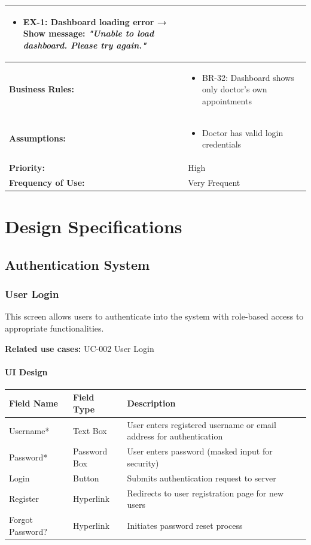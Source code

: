 \documentclass[12pt,a4paper]{article}
\begin{document}
\begin{longtable}{|p{4.5cm}|p{10.5cm}|}
\begin{itemize}
  \item EX-1: Dashboard loading error → Show message: \textit{"Unable to load dashboard. Please try again."}
\end{itemize} \\
\hline
\textbf{Business Rules:} &
\begin{itemize}
  \item BR-32: Dashboard shows only doctor's own appointments
\end{itemize} \\
\hline
\textbf{Assumptions:} &
\begin{itemize}
  \item Doctor has valid login credentials
\end{itemize} \\
\hline
\textbf{Priority:} & High \\
\hline
\textbf{Frequency of Use:} & Very Frequent \\
\hline
\end{longtable}

\section{Design Specifications}

\subsection{Authentication System}

\subsubsection{User Login}

This screen allows users to authenticate into the system with role-based access to appropriate functionalities.

\textbf{Related use cases:} UC-002 User Login

\paragraph{UI Design}

\begin{longtable}{|p{3cm}|p{3cm}|p{8cm}|}
\hline
\textbf{Field Name} & \textbf{Field Type} & \textbf{Description} \\
\hline
Username* & Text Box & User enters registered username or email address for authentication \\
\hline
Password* & Password Box & User enters password (masked input for security) \\
\hline
Login & Button & Submits authentication request to server \\
\hline
Register & Hyperlink & Redirects to user registration page for new users \\
\hline
Forgot Password? & Hyperlink & Initiates password reset process \\
\hline
\end{longtable}
\end{document}

